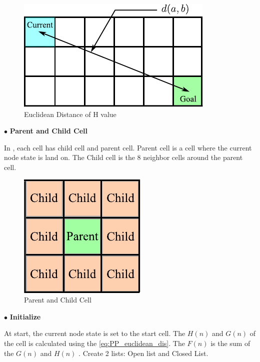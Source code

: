 \begin{figure}[ht]
	\centering
	\includegraphics[scale=1]{images/imagess/6pp-eud-h.pdf}
	\caption{Euclidean Distance of H value}
	\label{fig:Euclidean Distance of H value}
\end{figure}


$\bullet$ \textbf{Parent and Child Cell} \par
\hspace{1.27cm}
In \textbf{\figureautorefname{ \ref{fig:Parent and Child Cell}}}, each cell has child cell and parent cell. Parent cell is a cell where the current node state is land on. The Child cell is the 8 neighbor cells around the parent cell.\par

\begin{figure}[ht]
	\centering
	\includegraphics[scale=1]{images/imagess/6pp-par-chld.pdf}
	\caption{Parent and Child Cell}
	\label{fig:Parent and Child Cell}
\end{figure}

$\bullet$ \textbf{Initialize} \par
\hspace{1.27cm}
At start, the current node state is set to the start cell. The $H(n)$ and $G(n)$ of the cell is calculated using the \ref{eq:PP_euclidean_dis}. The $F(n)$ is the sum of the $G(n)$ and $H(n)$ \textbf{\figureautorefname{ \ref{fig:Start Point F,G,H}}}. Create 2 lists: Open list and Closed List.\par

